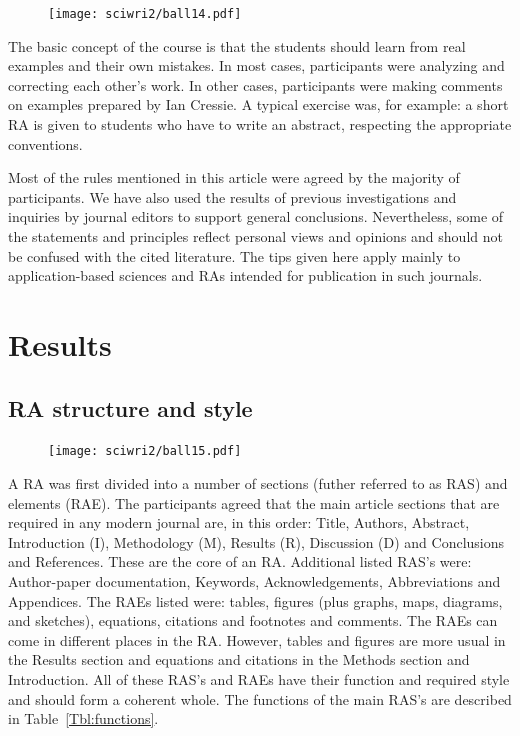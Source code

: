 \documentclass[graybox,envcountchap,sectrefs,UStrade]{svmono}
\begin{document}
\begin{figure}
\vspace{-20pt}
\texttt{[image: sciwri2/ball14.pdf]}
\vspace{-20pt}
\end{figure}
The basic concept of the course is that the students should learn from real examples and their own mistakes. In most cases, participants were analyzing and correcting each other's work. In other cases, participants were making comments on examples prepared by Ian Cressie. A typical exercise was, for example: a short RA is given to students who have to write an abstract, respecting the appropriate conventions. \par

Most of the rules mentioned in this article were agreed by the majority of participants. We have also used the results of previous investigations and inquiries by journal editors to support general conclusions. Nevertheless, some of the statements and principles reflect personal views and opinions and should not be confused with the cited literature. The tips given here apply mainly to application-based sciences and RAs intended for publication in such journals.\par


\section*{Results}
\subsection*{RA structure and style}

\begin{figure}
\vspace{-20pt}
\texttt{[image: sciwri2/ball15.pdf]}
\vspace{-20pt}
\end{figure}

A RA was first divided into a number of sections (futher referred to as RAS) and elements (RAE). The participants agreed that the main article sections that are required in any modern journal are, in this order: Title, Authors, Abstract, Introduction (I), Methodology (M), Results (R), Discussion (D) and Conclusions and References. These are the core of an RA. Additional listed RAS's were: Author-paper documentation, Keywords, Acknowledgements, Abbreviations and Appendices. The RAEs listed were: tables, figures (plus graphs, maps, diagrams, and sketches), equations, citations and footnotes and comments. The RAEs can come in different places in the RA. However, tables and figures are more usual in the Results section and equations and citations in the Methods section and Introduction. All of these RAS's and RAEs have their function and required style and should form a coherent whole. The functions of the main RAS's are described in Table~\ref{Tbl:functions}.\par
\end{document}
